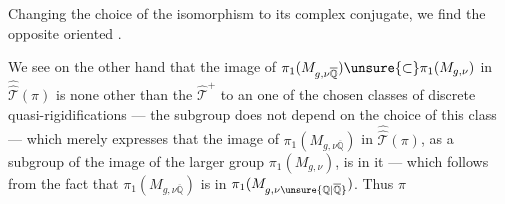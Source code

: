 Changing the choice of the isomorphism to its complex conjugate, we find the opposite oriented  .

We see on the other hand that the image of $\pi_1(M_{g,\nu\overline{\mathbb Q}})\unsure{\subset}\pi_1(M_{g,\nu})$ in $\widehat{\widehat{\mathcal T}}(\pi)$ is none other than the $\widehat{\mathcal T}^{+}$  to an  one of the chosen classes of discrete quasi-rigidifications --- the subgroup does not depend on the choice of this class --- which merely expresses that the image of $\pi_1(M_{g,\nu\overline{\mathbb Q}})$ in $\widehat{\widehat{\mathcal T}}(\pi)$,  as a subgroup of the image of the larger group $\pi_1(M_{g,\nu})$, is  in it --- which follows from the fact that $\pi_1(M_{g,\nu\overline{\mathbb Q}})$ is  in $\pi_1(M_{g,\nu\unsure{\mathbb Q|\overline{\mathbb Q}}})$. Thus $\pi$

